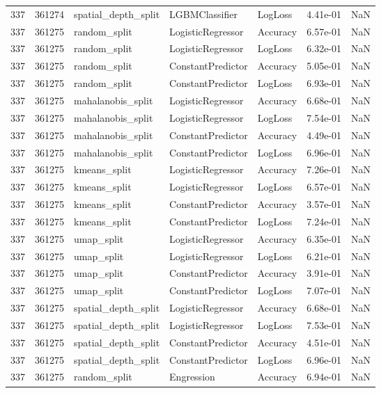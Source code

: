 \begin{tabular}{rrlllrr}
337 & 361274 & spatial\_depth\_split & LGBMClassifier & LogLoss & 4.41e-01 & NaN \\
337 & 361275 & random\_split & LogisticRegressor & Accuracy & 6.57e-01 & NaN \\
337 & 361275 & random\_split & LogisticRegressor & LogLoss & 6.32e-01 & NaN \\
337 & 361275 & random\_split & ConstantPredictor & Accuracy & 5.05e-01 & NaN \\
337 & 361275 & random\_split & ConstantPredictor & LogLoss & 6.93e-01 & NaN \\
337 & 361275 & mahalanobis\_split & LogisticRegressor & Accuracy & 6.68e-01 & NaN \\
337 & 361275 & mahalanobis\_split & LogisticRegressor & LogLoss & 7.54e-01 & NaN \\
337 & 361275 & mahalanobis\_split & ConstantPredictor & Accuracy & 4.49e-01 & NaN \\
337 & 361275 & mahalanobis\_split & ConstantPredictor & LogLoss & 6.96e-01 & NaN \\
337 & 361275 & kmeans\_split & LogisticRegressor & Accuracy & 7.26e-01 & NaN \\
337 & 361275 & kmeans\_split & LogisticRegressor & LogLoss & 6.57e-01 & NaN \\
337 & 361275 & kmeans\_split & ConstantPredictor & Accuracy & 3.57e-01 & NaN \\
337 & 361275 & kmeans\_split & ConstantPredictor & LogLoss & 7.24e-01 & NaN \\
337 & 361275 & umap\_split & LogisticRegressor & Accuracy & 6.35e-01 & NaN \\
337 & 361275 & umap\_split & LogisticRegressor & LogLoss & 6.21e-01 & NaN \\
337 & 361275 & umap\_split & ConstantPredictor & Accuracy & 3.91e-01 & NaN \\
337 & 361275 & umap\_split & ConstantPredictor & LogLoss & 7.07e-01 & NaN \\
337 & 361275 & spatial\_depth\_split & LogisticRegressor & Accuracy & 6.68e-01 & NaN \\
337 & 361275 & spatial\_depth\_split & LogisticRegressor & LogLoss & 7.53e-01 & NaN \\
337 & 361275 & spatial\_depth\_split & ConstantPredictor & Accuracy & 4.51e-01 & NaN \\
337 & 361275 & spatial\_depth\_split & ConstantPredictor & LogLoss & 6.96e-01 & NaN \\
337 & 361275 & random\_split & Engression & Accuracy & 6.94e-01 & NaN \\

\end{tabular}
